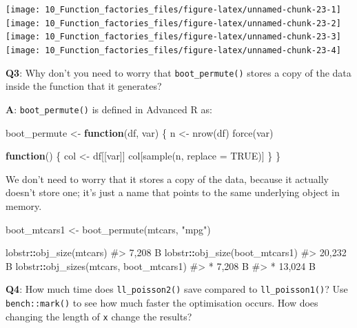 \documentclass[
]{krantz}
\makeatletter
\newenvironment{Shaded}{\begin{snugshade}}{\end{snugshade}}
\newcommand{\CommentTok}[1]{\textcolor[rgb]{0.56,0.35,0.01}{\textit{#1}}}
\newcommand{\ControlFlowTok}[1]{\textcolor[rgb]{0.13,0.29,0.53}{\textbf{#1}}}
\newcommand{\DataTypeTok}[1]{\textcolor[rgb]{0.13,0.29,0.53}{#1}}
\newcommand{\KeywordTok}[1]{\textcolor[rgb]{0.13,0.29,0.53}{\textbf{#1}}}
\newcommand{\NormalTok}[1]{#1}
\newcommand{\OperatorTok}[1]{\textcolor[rgb]{0.81,0.36,0.00}{\textbf{#1}}}
\newcommand{\OtherTok}[1]{\textcolor[rgb]{0.56,0.35,0.01}{#1}}
\newcommand{\StringTok}[1]{\textcolor[rgb]{0.31,0.60,0.02}{#1}}
\newenvironment{kframe}{%
\medskip{}
\setlength{\fboxsep}{.8em}
 \def\at@end@of@kframe{}%
 \ifinner\ifhmode%
  \def\at@end@of@kframe{\end{minipage}}%
  \begin{minipage}{\columnwidth}%
 \fi\fi%
 \def\FrameCommand##1{\hskip\@totalleftmargin \hskip-\fboxsep
 \colorbox{shadecolor}{##1}\hskip-\fboxsep
     \hskip-\linewidth \hskip-\@totalleftmargin \hskip\columnwidth}%
 \MakeFramed {\advance\hsize-\width
   \@totalleftmargin\z@ \linewidth\hsize
   \@setminipage}}%
 {\par\unskip\endMakeFramed%
 \at@end@of@kframe}
\renewenvironment{Shaded}{\begin{kframe}}{\end{kframe}}
\renewcommand{\KeywordTok} [1]{\textcolor[rgb]{0.00,0.44,0.13}{{#1}}}
\renewcommand{\DataTypeTok}[1]{\textcolor[rgb]{0.56,0.13,0.00}{{#1}}}
\renewcommand{\StringTok}  [1]{\textcolor[rgb]{0.25,0.44,0.63}{{#1}}}
\renewcommand{\CommentTok} [1]{\textcolor[rgb]{0.38,0.63,0.69}{{#1}}}
\renewcommand{\OtherTok}   [1]{\textcolor[rgb]{0.00,0.44,0.13}{{#1}}}
\renewcommand{\NormalTok}  [1]{{#1}}
\makeatother
\begin{document}
\begin{center}\texttt{[image: 10\_Function\_factories\_files/figure-latex/unnamed-chunk-23-1]} \texttt{[image: 10\_Function\_factories\_files/figure-latex/unnamed-chunk-23-2]} \texttt{[image: 10\_Function\_factories\_files/figure-latex/unnamed-chunk-23-3]} \texttt{[image: 10\_Function\_factories\_files/figure-latex/unnamed-chunk-23-4]} \end{center}

\textbf{{Q3}}: Why don't you need to worry that \texttt{boot\_permute()} stores a copy of the data inside the function that it generates?

\textbf{{A}}: \texttt{boot\_permute()} is defined in Advanced R as:

\begin{Shaded}
\begin{Highlighting}[]
\NormalTok{boot_permute <-}\StringTok{ }\ControlFlowTok{function}\NormalTok{(df, var) \{}
\NormalTok{  n <-}\StringTok{ }\KeywordTok{nrow}\NormalTok{(df)}
  \KeywordTok{force}\NormalTok{(var)}
  
  \ControlFlowTok{function}\NormalTok{() \{}
\NormalTok{    col <-}\StringTok{ }\NormalTok{df[[var]]}
\NormalTok{    col[}\KeywordTok{sample}\NormalTok{(n, }\DataTypeTok{replace =} \OtherTok{TRUE}\NormalTok{)]}
\NormalTok{  \}}
\NormalTok{\}}
\end{Highlighting}
\end{Shaded}

We don't need to worry that it stores a copy of the data, because it actually doesn't store one; it's just a name that points to the same underlying object in memory.

\begin{Shaded}
\begin{Highlighting}[]
\NormalTok{boot_mtcars1 <-}\StringTok{ }\KeywordTok{boot_permute}\NormalTok{(mtcars, }\StringTok{"mpg"}\NormalTok{)}

\NormalTok{lobstr}\OperatorTok{::}\KeywordTok{obj_size}\NormalTok{(mtcars)}
\CommentTok{#> 7,208 B}
\NormalTok{lobstr}\OperatorTok{::}\KeywordTok{obj_size}\NormalTok{(boot_mtcars1)}
\CommentTok{#> 20,232 B}
\NormalTok{lobstr}\OperatorTok{::}\KeywordTok{obj_sizes}\NormalTok{(mtcars, boot_mtcars1)}
\CommentTok{#> *  7,208 B}
\CommentTok{#> * 13,024 B}
\end{Highlighting}
\end{Shaded}

\textbf{{Q4}}: How much time does \texttt{ll\_poisson2()} save compared to \texttt{ll\_poisson1()}? Use \texttt{bench::mark()} to see how much faster the optimisation occurs. How does changing the length of \texttt{x} change the results?
\end{document}
